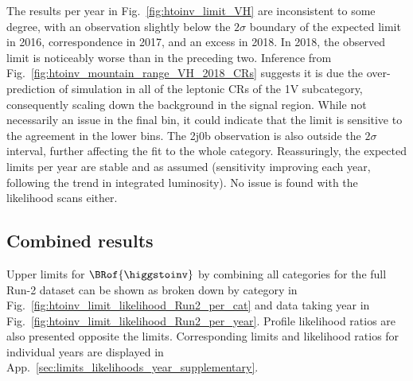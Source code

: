 
The results per year in Fig.~\ref{fig:htoinv_limit_VH} are inconsistent to some degree, with an observation slightly below the $\text{2}\sigma$ boundary of the expected limit in 2016, correspondence in 2017, and an excess in 2018. In 2018, the observed limit is noticeably worse than in the preceding two. Inference from Fig.~\ref{fig:htoinv_mountain_range_VH_2018_CRs} suggests it is due the over-prediction of simulation in all of the leptonic \glspl{CR} of the 1V subcategory, consequently scaling down the background in the signal region. While not necessarily an issue in the final \ptmiss bin, it could indicate that the limit is sensitive to the agreement in the lower bins. The 2j0b observation is also outside the $\text{2}\sigma$ interval, further affecting the fit to the whole category. Reassuringly, the expected limits per year are stable and as assumed (sensitivity improving each year, following the trend in integrated luminosity). No issue is found with the likelihood scans either.

\clearpage




\subsection{Combined results}
\label{subsec:htoinv_combined_results}

Upper limits for $\BRof{\higgstoinv}$ by combining all categories for the full Run-2 dataset can be shown as broken down by category in Fig.~\ref{fig:htoinv_limit_likelihood_Run2_per_cat} and data taking year in Fig.~\ref{fig:htoinv_limit_likelihood_Run2_per_year}. Profile likelihood ratios are also presented opposite the limits. Corresponding limits and likelihood ratios for individual years are displayed in App.~\ref{sec:limits_likelihoods_year_supplementary}.

